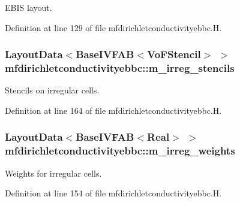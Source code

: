 E\+B\+IS layout. 



Definition at line 129 of file mfdirichletconductivityebbc.\+H.

\subsubsection[{\texorpdfstring{m\+\_\+irreg\+\_\+stencils}{m_irreg_stencils}}]{\setlength{\rightskip}{0pt plus 5cm}Layout\+Data$<$Base\+I\+V\+F\+AB$<$Vo\+F\+Stencil$>$ $>$ mfdirichletconductivityebbc\+::m\+\_\+irreg\+\_\+stencils\hspace{0.3cm}{\ttfamily [protected]}}\hypertarget{classmfdirichletconductivityebbc_ae3cafa8c8269a7668956b4507613dc4f}{}\label{classmfdirichletconductivityebbc_ae3cafa8c8269a7668956b4507613dc4f}


Stencils on irregular cells. 



Definition at line 164 of file mfdirichletconductivityebbc.\+H.

\subsubsection[{\texorpdfstring{m\+\_\+irreg\+\_\+weights}{m_irreg_weights}}]{\setlength{\rightskip}{0pt plus 5cm}Layout\+Data$<$Base\+I\+V\+F\+AB$<$Real$>$ $>$ mfdirichletconductivityebbc\+::m\+\_\+irreg\+\_\+weights\hspace{0.3cm}{\ttfamily [protected]}}\hypertarget{classmfdirichletconductivityebbc_a2c847b85472e27bf802b40186843e402}{}\label{classmfdirichletconductivityebbc_a2c847b85472e27bf802b40186843e402}


Weights for irregular cells. 



Definition at line 154 of file mfdirichletconductivityebbc.\+H.

